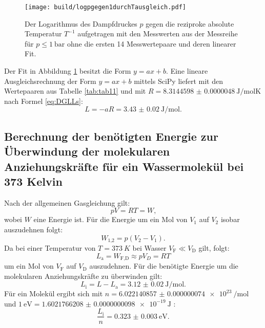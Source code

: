 \begin{figure}
	\centering
	\caption{Der Logarithmus des Dampfdruckes $p$ gegen die reziproke absolute Temperatur $T^{-1}$ aufgetragen mit den Messwerten aus der Messreihe für $p\leq \SI{1}{\bar}$ ohne die ersten 14 Messwertepaare und deren linearer Fit.}
	\texttt{[image: build/logpgegen1durchTausgleich.pdf]}
	\label{fig:Graph2}
\end{figure}
Der Fit in Abbildung \ref{fig:Graph2} besitzt die Form $y=a x + b$. Eine lineare Ausgleichsrechnung der Form $y=a x + b$ mittels SciPy \cite{scipy} liefert mit den Wertepaaren aus Tabelle \ref{tab:tab11} und mit $R=\SI{8.3144598(48)}{\joule\per\mol\kelvin}$ \cite{R} nach Formel \eqref{eq:DGLLs}:
\begin{displaymath}
L = -a R = \SI{3.43(2)}{\joule\per\mol}\text{.}
\end{displaymath}

\subsection{Berechnung der benötigten Energie zur Überwindung der molekularen Anziehungskräfte für ein Wassermolekül bei 373 Kelvin}
Nach der allgemeinen Gasgleichung gilt:
\begin{equation}
p V = R T = W \text{,}\label{eq:Gas}
\end{equation}
wobei $W$ eine Energie ist.
Für die Energie um ein Mol von $V_1$ auf $V_2$ isobar auszudehnen folgt:
\begin{equation}
W_\text{1,2} = p (V_2-V_1)\text{.}
\end{equation}
Da bei einer Temperatur von $T=\SI{373}{K}$ bei Wasser $V_\text{F}\ll V_\text{D}$ gilt, folgt:
\begin{equation}
	L_\text{a} = W_\text{F,D} \approx p V_D = R T
\end{equation} 
um ein Mol von $V_\text{F}$ auf $V_\text{D}$ auszudehnen.
Für die benötigte Energie um die molekularen Anziehungskräfte zu überwinden gilt:
\begin{equation}
	L_\text{i}= L - L_\text{a} = \SI{3.12(2)}{\joule\per\mol}\text{.}
\end{equation}
Für ein Molekül ergibt sich mit $n=\SI{6.022140857(74)e23}{\per\mol}$ \cite{n} und $\SI{1}{\electronvolt}=\SI{1.6021766208(98)e-19}{\joule}$ \cite{eV}:
\begin{equation}
	\frac{L_\text{i}}{n} = \SI{0.323(3)}{\electronvolt}\text{.}
\end{equation}


